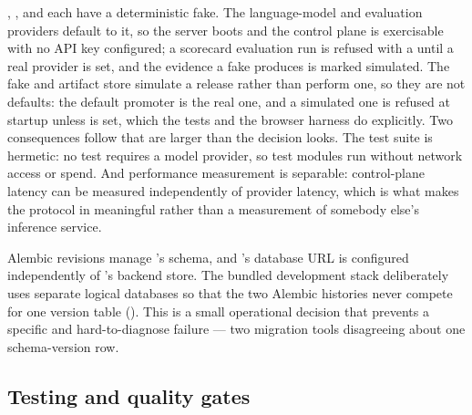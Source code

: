  ,
, and  each have a deterministic fake. The
language-model and evaluation providers default to it, so the server boots and the
control plane is exercisable with no API key configured; a scorecard evaluation run is refused with a
 until a real provider is set, and the evidence a fake produces is marked
simulated. The fake  and artifact store simulate a release rather than
perform one, so they are not defaults: the default promoter is the real \mlflow{}
one, and a simulated one is refused at startup unless
 is set, which the tests and the
browser harness do explicitly. Two consequences follow that are larger than the
decision looks.
The test suite is hermetic: no test requires a model provider, so
\statTestFiles{} test modules run without network access or spend. And performance
measurement is separable: control-plane latency can be measured independently of
provider latency, which is what makes the protocol in 
meaningful rather than a measurement of somebody else's inference service.

 \statMigrations{} Alembic revisions
manage \sys's schema, and \sys's database URL is configured independently of
\mlflow{}'s backend store. The bundled development stack deliberately uses separate
logical databases so that the two Alembic histories never compete for one version
table (). This is a small operational decision that prevents
a specific and hard-to-diagnose failure --- two migration tools disagreeing about
one schema-version row.

\subsection{Testing and quality gates}

